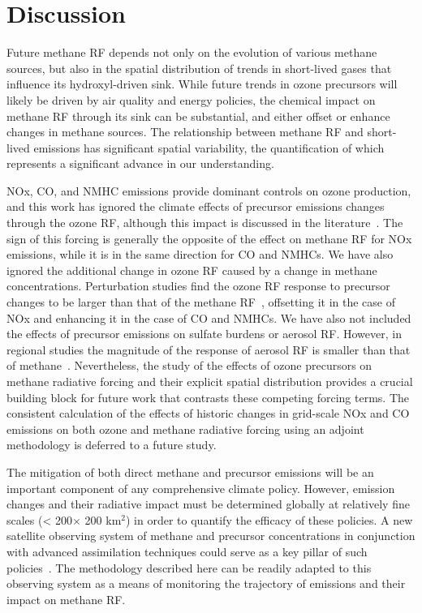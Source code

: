 \section{Discussion}

Future methane RF depends not only on the evolution of various methane sources, but also in the spatial distribution of trends in short-lived gases that influence its hydroxyl-driven sink. While future trends in ozone precursors will likely be driven by air quality and energy policies, the chemical impact on methane RF through its sink can be substantial, and either offset or enhance changes in methane sources. The relationship between methane RF and short-lived emissions has significant spatial variability, the quantification of which represents a significant advance in our understanding.

NOx, CO, and NMHC emissions provide dominant controls on ozone production, and this work has ignored the climate effects of precursor emissions changes through the ozone RF, although this impact is discussed in the literature~\citep{ref:naik2005,ref:bowman2012,ref:shindell2013}. The sign of this forcing is generally the opposite of the effect on methane RF for NOx emissions, while it is in the same direction for CO and NMHCs. We have also ignored the additional change in ozone RF caused by a change in methane concentrations. Perturbation studies find the ozone RF response to precursor changes to be larger than that of the methane RF~\citep{ref:akimoto2015}, offsetting it in the case of NOx and enhancing it in the case of CO and NMHCs. We have also not included the effects of precursor emissions on sulfate burdens or aerosol RF. However, in regional studies the magnitude of the response of aerosol RF is smaller than that of methane~\citep{ref:fry2012}. Nevertheless, the study of the effects of ozone precursors on methane radiative forcing and their explicit spatial distribution provides a crucial building block for future work that contrasts these competing forcing terms. The consistent calculation of the effects of historic changes in grid-scale NOx and CO emissions on both ozone and methane radiative forcing using an adjoint methodology is deferred to a future study.

The mitigation of both direct methane and precursor emissions will be an important component of any comprehensive climate policy.  However, emission changes and their radiative impact must be determined globally at relatively fine scales (< 200$\times$ 200 km$^2$) in order to quantify the efficacy of these policies.  A new satellite observing system of methane and precursor concentrations in conjunction with advanced assimilation techniques could serve as a key pillar of such policies~\cite{Bowman:2013kx}. The methodology described here can be readily adapted to this observing system as a means of monitoring the trajectory of emissions and their impact on methane RF.  

